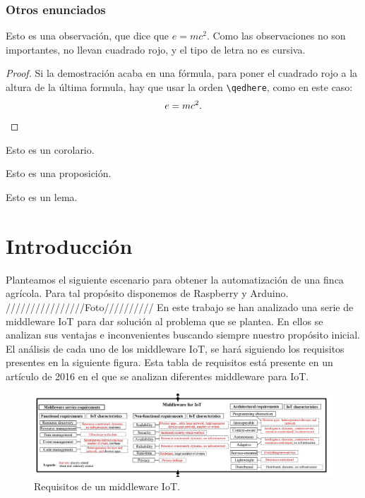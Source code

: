 \documentclass[12pt, twoside]{book}
\begin{document}
\subsection{Otros enunciados}


\begin{remark}
    Esto es una observación, que dice que $e=mc^{2}$. Como las observaciones no son importantes, no llevan cuadrado rojo, y el tipo de letra no es cursiva.
\end{remark}


\begin{proof}
    Si la demostración acaba en una fórmula, para poner el cuadrado rojo a la altura de la última formula, hay que usar la orden \verb|\qedhere|, como en este caso:
    \[
        e=mc^{2}.\qedhere
    \]

\end{proof}


\begin{corollary}\label{cor:1}
    Esto es un corolario.
\end{corollary}

\begin{proposition}\label{pro:1}
    Esto es una proposición.
\end{proposition}

\begin{lemma}[Gauss]\label{lem:1}
    Esto es un lema.
\end{lemma}


\backmatter



\chapter{Introducción}
Planteamos el siguiente escenario para obtener la automatización de una finca agrícola. Para tal propósito disponemos de Raspberry y Arduino.
////////////////Foto//////////
En este trabajo se han analizado una serie de middleware IoT para dar solución al problema que se plantea. En ellos se analizan sus ventajas e inconvenientes buscando siempre nuestro propósito inicial. El análisis de cada uno de los middleware IoT, se hará siguiendo los requisitos presentes en la siguiente figura. Esta tabla de requisitos está presente en un artículo de 2016 \cite{surv} en el que se analizan diferentes middleware para IoT.
\begin{figure}[H]
\centering
\includegraphics[scale=0.5]{images/requisitos}
\caption{Requisitos de un middleware IoT.}\label{L105}
\end{figure}
\end{document}
